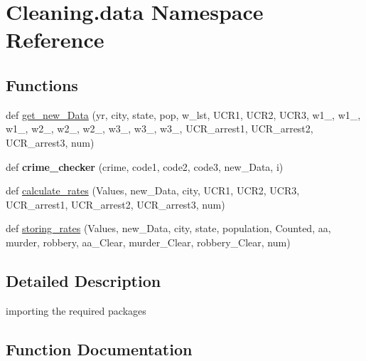 \hypertarget{namespace_cleaning_1_1data}{}\section{Cleaning.\+data Namespace Reference}
\label{namespace_cleaning_1_1data}
\subsection*{Functions}
\begin{DoxyCompactItemize}
\item 
def \hyperlink{namespace_cleaning_1_1data_ac3d401c21c62ef73bb12afc4818b2a39}{get\+\_\+new\+\_\+\+Data} (yr, city, state, pop, w\+\_\+lst, U\+C\+R1, U\+C\+R2, U\+C\+R3, w1\+\_, w1\+\_, w1\+\_, w2\+\_, w2\+\_, w2\+\_, w3\+\_, w3\+\_, w3\+\_, U\+C\+R\+\_\+arrest1, U\+C\+R\+\_\+arrest2, U\+C\+R\+\_\+arrest3, num)
\item 
\hypertarget{namespace_cleaning_1_1data_a4a2ba389e4b5120c415704650f77158a}{}def {\bfseries crime\+\_\+checker} (crime, code1, code2, code3, new\+\_\+\+Data, i)\label{namespace_cleaning_1_1data_a4a2ba389e4b5120c415704650f77158a}

\item 
def \hyperlink{namespace_cleaning_1_1data_a8d0b5670a07bc39e8f152c55344578af}{calculate\+\_\+rates} (Values, new\+\_\+\+Data, city, U\+C\+R1, U\+C\+R2, U\+C\+R3, U\+C\+R\+\_\+arrest1, U\+C\+R\+\_\+arrest2, U\+C\+R\+\_\+arrest3, num)
\item 
def \hyperlink{namespace_cleaning_1_1data_a75b46275d4c4872faadabd1521ae04fa}{storing\+\_\+rates} (Values, new\+\_\+\+Data, city, state, population, Counted, aa, murder, robbery, aa\+\_\+\+Clear, murder\+\_\+\+Clear, robbery\+\_\+\+Clear, num)
\end{DoxyCompactItemize}


\subsection{Detailed Description}
\begin{DoxyVerb}importing the required packages\end{DoxyVerb}
 

\subsection{Function Documentation}
\hypertarget{namespace_cleaning_1_1data_a8d0b5670a07bc39e8f152c55344578af}{}
